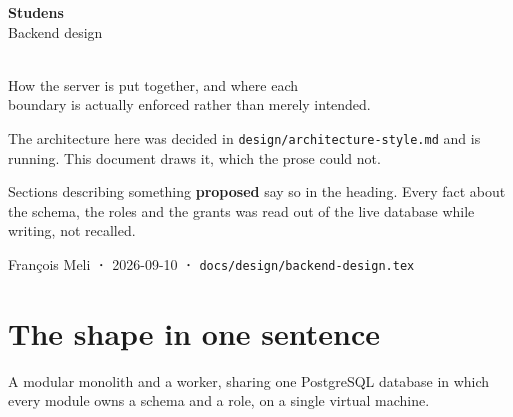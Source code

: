 \documentclass[11pt,a4paper]{article}
\begin{document}
\begin{titlepage}
\centering
\vspace*{2.2cm}
{\sffamily\fontsize{34}{40}\selectfont\bfseries\color{studens}Studens}\\[2mm]
{\sffamily\large\color{muted}Backend design}\\[10mm]
\\[10mm]
{\sffamily\normalsize How the server is put together, and where each\\
boundary is actually enforced rather than merely intended.}\\[16mm]

\begin{tcolorbox}[width=0.86\textwidth,colback=studenslt,colframe=studens,
  arc=2pt,fonttitle=\sffamily\bfseries,title={Status: mostly built}]
\sffamily\small
The architecture here was decided in \texttt{design/architecture-style.md} and
is running. This document draws it, which the prose could not.

Sections describing something \textbf{proposed} say so in the heading. Every
fact about the schema, the roles and the grants was read out of the live
database while writing, not recalled.
\end{tcolorbox}

\vfill
{\sffamily\footnotesize\color{muted}François Meli \textbf{·} 2026-09-10 \textbf{·} \texttt{docs/design/backend-design.tex}}
\end{titlepage}

\tableofcontents
\newpage

\section{The shape in one sentence}

A modular monolith and a worker, sharing one PostgreSQL database in which every
module owns a schema and a role, on a single virtual machine.
\end{document}
